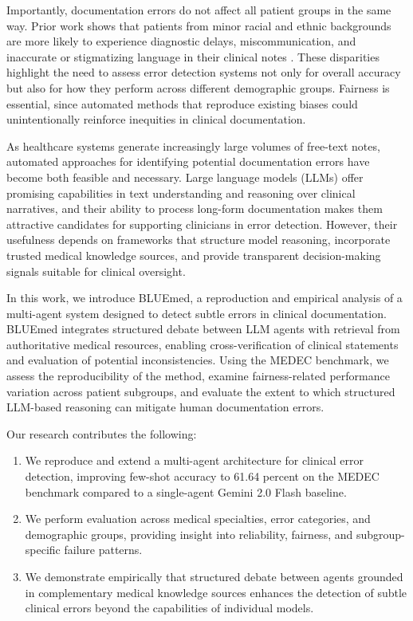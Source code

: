 \documentclass[11pt]{article}
\begin{document}
Importantly, documentation errors do not affect all patient groups in the same way. Prior work shows that patients from minor racial and ethnic backgrounds are more likely to experience diagnostic delays, miscommunication, and inaccurate or stigmatizing language in their clinical notes \citep{chen2021racial,sun2022bias}. These disparities highlight the need to assess error detection systems not only for overall accuracy but also for how they perform across different demographic groups. Fairness is essential, since automated methods that reproduce existing biases could unintentionally reinforce inequities in clinical documentation.

As healthcare systems generate increasingly large volumes of free-text notes, automated approaches for identifying potential documentation errors have become both feasible and necessary. Large language models (LLMs) offer promising capabilities in text understanding and reasoning over clinical narratives, and their ability to process long-form documentation makes them attractive candidates for supporting clinicians in error detection. However, their usefulness depends on frameworks that structure model reasoning, incorporate trusted medical knowledge sources, and provide transparent decision-making signals suitable for clinical oversight.


In this work, we introduce BLUEmed, a reproduction and empirical analysis of a multi-agent system designed to detect subtle errors in clinical documentation. BLUEmed integrates structured debate between LLM agents with retrieval from authoritative medical resources, enabling cross-verification of clinical statements and evaluation of potential inconsistencies. Using the MEDEC benchmark, we assess the reproducibility of the method, examine fairness-related performance variation across patient subgroups, and evaluate the extent to which structured LLM-based reasoning can mitigate human documentation errors.


Our research contributes the following:

\begin{enumerate}
    \item We reproduce and extend a multi-agent architecture for clinical error detection, improving few-shot accuracy to 61.64 percent on the MEDEC benchmark compared to a single-agent Gemini 2.0 Flash baseline.
    
    \item We perform  evaluation across medical specialties, error categories, and demographic groups, providing insight into reliability, fairness, and subgroup-specific failure patterns.
    
    \item We demonstrate empirically that structured debate between agents grounded in complementary medical knowledge sources enhances the detection of subtle clinical errors beyond the capabilities of individual models.
\end{enumerate}
\end{document}
